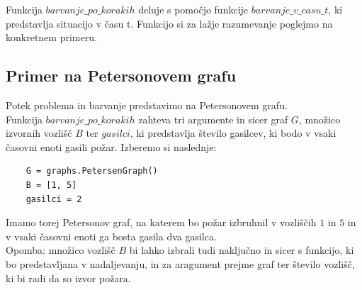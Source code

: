 \documentclass[a4paper, 12pt]{article}
\begin{document}
\noindent Funkcija $barvanje\_po\_korakih$ deluje s pomočjo funkcije $barvanje\_v\_casu\_t$, ki predstavlja
situacijo v času t. Funkcijo si za lažje razumevanje poglejmo na konkretnem primeru.

\subsection{Primer na Petersonovem grafu}
\noindent Potek problema in barvanje predstavimo na Petersonovem grafu. \\ 
Funkcija $barvanje\_po\_korakih$ zahteva tri argumente
in sicer graf $G$, množico izvornih vozlišč $B$ ter $gasilci$, ki predstavlja število gasilcev, ki 
bodo v vsaki časovni enoti gasili požar.
Izberemo si naslednje:
\begin{small}
\begin{verbatim}
    G = graphs.PetersenGraph()
    B = [1, 5]
    gasilci = 2
\end{verbatim}
\end{small}
Imamo torej Petersonov graf, na katerem bo požar izbruhnil v vozliščih $1$ in $5$ in v vsaki časovni enoti ga bosta
gasila dva gasilca. \\
Opomba: množico vozlišč $B$ bi lahko izbrali tudi naključno in sicer s funkcijo, ki bo predstavljana
v nadaljevanju, in za aragument prejme graf ter število vozlišč, ki bi radi da so izvor požara. \\
\end{document}
